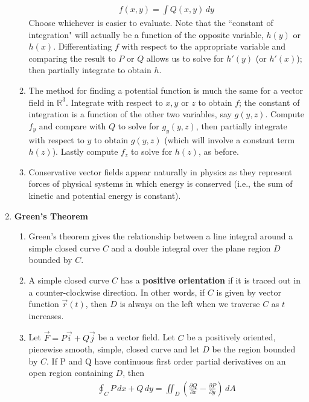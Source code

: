\documentclass[10pt]{article}
\begin{document}
\begin{multicols}{2}
\begin{enumerate}
\begin{enumerate}
\begin{align*}
            f(x,y) = \int Q(x,y) \,dy
        \end{align*}
        Choose whichever is easier to evaluate. Note that the ``constant of integration" will actually be a function of the opposite variable, $h(y)$ or $h(x)$. Differentiating $f$ with respect to the appropriate variable and comparing the result to $P$ or $Q$ allows us to solve for $h'(y)$ (or $h'(x)$); then partially integrate to obtain $h$.
        \item The method for finding a potential function is much the same for a vector field in $\mathbb{R}^3$. Integrate with respect to $x,y$ or $z$ to obtain $f$; the constant of integration is a function of the other two variables, say $g(y,z)$. Compute $f_y$ and compare with $Q$ to solve for $g_y(y,z)$, then partially integrate with respect to $y$ to obtain $g(y,z)$ (which will involve a constant term $h(z)$). Lastly compute $f_z$ to solve for $h(z)$, as before.
        \item Conservative vector fields appear naturally in physics as they represent forces of physical systems in which energy is conserved (i.e., the sum of kinetic and potential energy is constant).
    \end{enumerate}
    
    \item \textbf{Green's Theorem}
    \begin{enumerate}
        \item Green's theorem gives the relationship between a line integral around a simple closed curve $C$ and a double integral over the plane region $D$ bounded by $C$.
        \item A simple closed curve $C$ has a \textbf{positive orientation} if it is traced out in a counter-clockwise direction. In other words, if $C$ is given by vector function $\vec{r}(t)$, then $D$ is always on the left when we traverse $C$ as $t$ increases.
        \item Let $\vec{F} = P\vec{i} + Q\vec{j}$ be a vector field. Let $C$ be a positively oriented, piecewise smooth, simple, closed curve and let $D$ be the region bounded by $C$. If P and Q have continuous first order partial derivatives on an open region containing $D$, then
        \begin{align*}
            \oint_C P \,dx + Q \,dy = \iint_D \left( \frac{\partial Q}{\partial x} - \frac{\partial P}{\partial y}\right) \, dA
        \end{align*}
        

\end{enumerate}
\end{enumerate}
\end{multicols}
\end{document}
